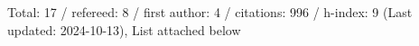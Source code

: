 Total: 17 / refereed: 8 / first author: 4 / citations: 996 / h-index: 9 (Last updated: 2024-10-13), List attached below